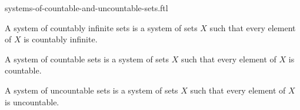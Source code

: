\documentclass{naproche-library}
\begin{document}
\begin{smodule}[title=Systems of Countable and Uncountable Sets]{systems-of-countable-and-uncountable-sets.ftl}

\begin{definition}[forthel,id=FOUNDATIONS_14_3786392159125504]
  A system of countably infinite sets is a system of sets $X$ such that every element of $X$ is countably infinite.
\end{definition}

\begin{definition}[forthel,id=FOUNDATIONS_14_7341152585908224]
  A system of countable sets is a system of sets $X$ such that every element of $X$ is countable.
\end{definition}

\begin{definition}[forthel,id=FOUNDATIONS_14_6106935677943808]
  A system of uncountable sets is a system of sets $X$ such that every element of $X$ is uncountable.
\end{definition}
\end{smodule}
\end{document}
